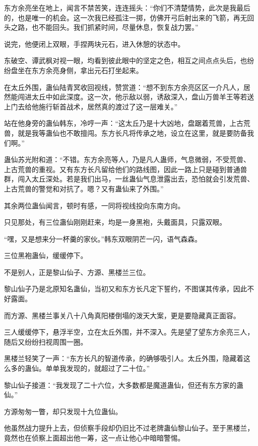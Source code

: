\begin{this_body}
东方余亮坐在地上，闻言不禁苦笑，连连摇头：“你们不清楚情势，此次是我最后的，也是唯一的机会。这一次我已经孤注一掷，仿佛开弓后射出来的飞箭，再无回头之路，也不能回头。我们抓紧时间，尽量休息，恢复战力罢。”

说完，他便闭上双眼，手捏两块元石，进入休憩的状态中。

东破空、谭武枫对视一眼，均看到彼此眼中的坚定之色，相互之间点点头后，也纷纷盘坐在东方余亮身侧，拿出元石打坐起来。

在太丘外围，蛊仙陆青冥收回视线，赞赏道：“想不到东方余亮区区一介凡人，居然能闯进太丘中如此深度。这一次，他示敌以弱，诱敌深入，盘山万兽羊王等若送上门去给他施行斩首战术，居然真的渡过了这一层难关。”

站在他身旁的蛊仙韩东，冷哼一声：“这太丘乃是十大凶地，盘踞着荒兽，上古荒兽，就是我等蛊仙也不敢擅闯。东方长凡将传承之地，设立在这里，就是要防备我们啊。”

蛊仙苏光附和道：“不错。东方余亮等人，乃是凡人蛊师，气息微弱，不受荒兽、上古荒兽的重视。又有东方长凡留给他们的路线图，因此一路上只是碰到普通兽群，闯入太丘深处。若是我们出马，一丝蛊仙气息泄露出去，恐怕就会引发荒兽、上古荒兽的警觉和对抗了。嗯？又有蛊仙来了外围。”

其余两位蛊仙闻言，顿时有感，一同将视线投向东南方向。

只见那处，有三位蛊仙刚刚赶来，均是一身黑袍，头戴面具，只露双眼。

“嘿，又是想来分一杯羹的家伙。”韩东双眼阴芒一闪，语气森森。

三位黑袍蛊仙，缓缓停下。

不是别人，正是黎山仙子、方源、黑楼兰三位。

黎山仙子乃是北原知名蛊仙，当初又和东方长凡定下誓约，不图谋其传承，因此不好露面。

而方源、黑楼兰事关八十八角真阳楼倒塌的泼天大案，更是要隐藏真正面容。

三人缓缓停下，悬浮半空，立在太丘外围，并不深入。先是望了望东方余亮三人，随后又纷纷扫视周围一圈。

黑楼兰轻笑了一声：“东方长凡的智道传承，的确够吸引人。太丘外围，隐藏着这么多的蛊仙。单单我发现的，就超过了二十位。”

黎山仙子接道：“我发现了二十六位，大多数都是魔道蛊仙，但还有东方家的蛊仙。”

方源匆匆一瞥，却只发现十九位蛊仙。

他虽然战力提升上去，但侦察手段却仍旧比不过老牌蛊仙黎山仙子。至于黑楼兰，竟然也在侦察上面超出他一筹，这一点让他心中暗暗警惕。


\end{this_body}
